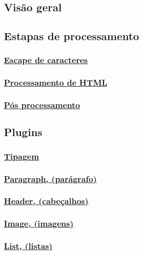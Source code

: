 \subsection{Visão geral}

\subsection{Estapas de processamento}

\subsubsection{\underline{Escape de caracteres}}

\subsubsection{\underline{Processamento de HTML}}

\subsubsection{\underline{Pós processamento}}

\subsection{Plugins}

\subsubsection{\underline{Tipagem}}

\subsubsection{\underline{Paragraph, (parágrafo)}}

\subsubsection{\underline{Header, (cabeçalhos)}}

\subsubsection{\underline{Image, (imagens)}}

\subsubsection{\underline{List, (listas)}}

